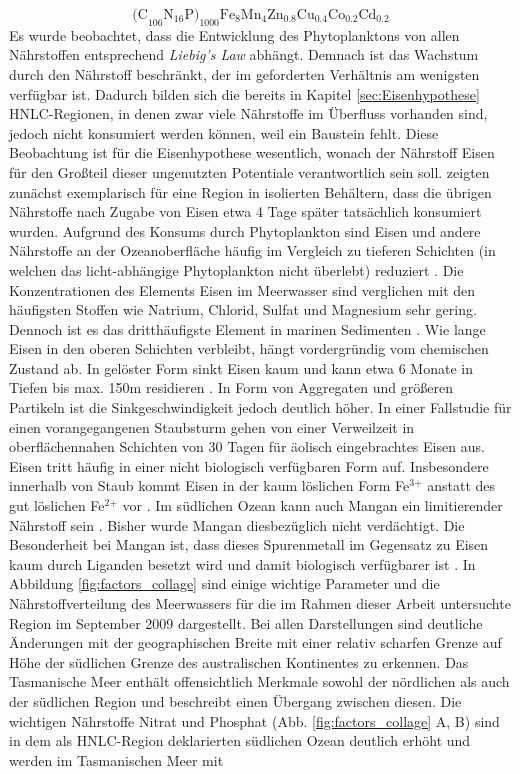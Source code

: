 \documentclass[12pt,a4paper,onecolumn]{scrartcl}
\begin{document}
\begin{equation}
\text{(C}_{106} \text{N}_{16} \text{P)}_{1000} \text{Fe}_8\text{Mn}_4\text{Zn}_{0.8}\text{Cu}_{0.4}\text{Co}_{0.2} \text{Cd}_{0.2} \label{eq:stochio}
\end{equation}
Es wurde beobachtet, dass die Entwicklung des Phytoplanktons von allen Nährstoffen entsprechend \textit{Liebig's Law} abhängt. Demnach ist das Wachstum durch den Nährstoff beschränkt, der im geforderten Verhältnis am wenigsten verfügbar ist. Dadurch bilden sich die bereits in Kapitel \ref{sec:Eisenhypothese} HNLC-Regionen, in denen zwar viele Nährstoffe im Überfluss vorhanden sind, jedoch nicht konsumiert werden können, weil ein Baustein fehlt. Diese Beobachtung ist für die Eisenhypothese wesentlich, wonach der Nährstoff Eisen für den Großteil dieser ungenutzten Potentiale verantwortlich sein soll. \citet{Martin.1988} zeigten zunächst exemplarisch für eine Region in isolierten Behältern, dass die übrigen Nährstoffe nach Zugabe von Eisen etwa 4 Tage später tatsächlich konsumiert wurden. Aufgrund des Konsums durch Phytoplankton sind Eisen und andere Nährstoffe an der Ozeanoberfläche häufig im Vergleich zu tieferen Schichten (in welchen das licht-abhängige Phytoplankton nicht überlebt) reduziert \citep{Martin.1990}. Die Konzentrationen des Elements Eisen im Meerwasser sind verglichen mit den häufigsten Stoffen wie Natrium, Chlorid, Sulfat und Magnesium sehr gering. Dennoch ist es das dritthäufigste Element in marinen Sedimenten \citep{Emerson.2009}. Wie lange Eisen in den oberen Schichten verbleibt, hängt vordergründig vom chemischen Zustand ab. In gelöster Form sinkt Eisen kaum und kann etwa 6 Monate in Tiefen bis max. 150m residieren \citep{Hayes.2015}. In Form von Aggregaten und größeren Partikeln ist die Sinkgeschwindigkeit jedoch deutlich höher. In einer Fallstudie für einen vorangegangenen Staubsturm gehen \citet{Boyd.2010} von einer Verweilzeit in oberflächennahen Schichten von 30 Tagen für äolisch eingebrachtes Eisen aus. Eisen tritt häufig in einer nicht biologisch verfügbaren Form auf. Insbesondere innerhalb von Staub kommt Eisen in der kaum löslichen Form Fe$^\text{3+}$ anstatt des gut löslichen Fe$^\text{2+}$ vor \citep{Reynolds.2014}. Im südlichen Ozean kann auch Mangan ein limitierender Nährstoff sein \citep{Browning.2021}. Bisher wurde Mangan diesbezüglich nicht verdächtigt. Die Besonderheit bei Mangan ist, dass dieses Spurenmetall im Gegensatz zu Eisen kaum durch Liganden besetzt wird und damit biologisch verfügbarer ist \citep{Emerson.2009}. In Abbildung \ref{fig:factors_collage} sind einige wichtige Parameter und die Nährstoffverteilung des Meerwassers für die im Rahmen dieser Arbeit untersuchte Region im September 2009 dargestellt. Bei allen Darstellungen sind deutliche Änderungen mit der geographischen Breite mit einer relativ scharfen Grenze auf Höhe der südlichen Grenze des australischen Kontinentes zu erkennen. Das Tasmanische Meer enthält offensichtlich Merkmale sowohl der nördlichen als auch der südlichen Region und beschreibt einen Übergang zwischen diesen. Die wichtigen Nährstoffe Nitrat und Phosphat (Abb. \ref{fig:factors_collage} A, B) sind in dem als HNLC-Region deklarierten südlichen Ozean deutlich erhöht und werden im Tasmanischen Meer mit 
\end{document}

